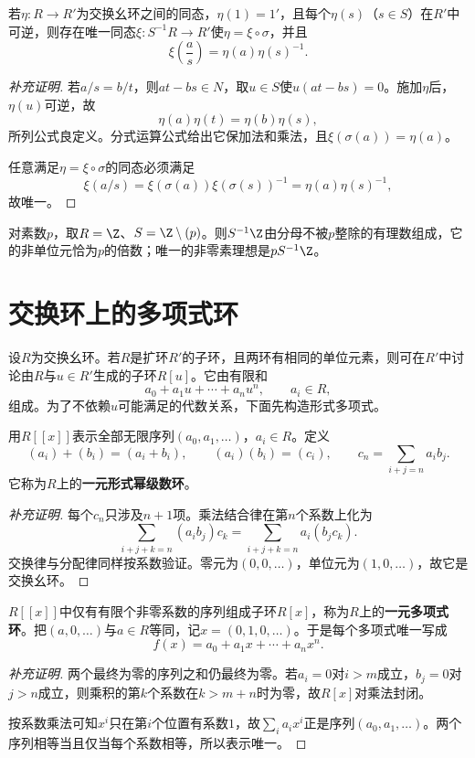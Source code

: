 \begin{theorem}\label{p2:localization-universal}
若$\eta:R\to R'$为交换幺环之间的同态，$\eta(1)=1'$，且每个$\eta(s)$（$s\in S$）在$R'$中可逆，则存在唯一同态$\xi:S^{-1}R\to R'$使$\eta=\xi\circ\sigma$，并且
\[
\xi\!\left(\frac as\right)=\eta(a)\eta(s)^{-1}.
\]
\end{theorem}
\begin{proof}[补充证明]
若$a/s=b/t$，则$at-bs\in N$，取$u\in S$使$u(at-bs)=0$。施加$\eta$后，$\eta(u)$可逆，故
\[
\eta(a)\eta(t)=\eta(b)\eta(s),
\]
所列公式良定义。分式运算公式给出它保加法和乘法，且$\xi(\sigma(a))=\eta(a)$。

任意满足$\eta=\xi\circ\sigma$的同态必须满足
\[
\xi(a/s)=\xi(\sigma(a))\xi(\sigma(s))^{-1}
=\eta(a)\eta(s)^{-1},
\]
故唯一。
\end{proof}

\begin{example}
对素数$p$，取$R=\Z$、$S=\Z\setminus(p)$。则$S^{-1}\Z$由分母不被$p$整除的有理数组成，它的非单位元恰为$p$的倍数；唯一的非零素理想是$pS^{-1}\Z$。
\end{example}

\section{交换环上的多项式环}

设$R$为交换幺环。若$R$是扩环$R'$的子环，且两环有相同的单位元素，则可在$R'$中讨论由$R$与$u\in R'$生成的子环$R[u]$。它由有限和
\[
a_0+a_1u+\cdots+a_nu^n,\qquad a_i\in R,
\]
组成。为了不依赖$u$可能满足的代数关系，下面先构造形式多项式。

\begin{definition}
用$R[[x]]$表示全部无限序列$(a_0,a_1,\ldots)$，$a_i\in R$。定义
\[
(a_i)+(b_i)=(a_i+b_i),\qquad
(a_i)(b_i)=(c_i),\qquad c_n=\sum_{i+j=n}a_ib_j.
\]
它称为$R$上的\textbf{一元形式幂级数环}。
\end{definition}
\begin{proof}[补充证明]
每个$c_n$只涉及$n+1$项。乘法结合律在第$n$个系数上化为
\[
\sum_{i+j+k=n}(a_ib_j)c_k
=\sum_{i+j+k=n}a_i(b_jc_k).
\]
交换律与分配律同样按系数验证。零元为$(0,0,\ldots)$，单位元为$(1,0,\ldots)$，故它是交换幺环。
\end{proof}

\begin{definition}
$R[[x]]$中仅有有限个非零系数的序列组成子环$R[x]$，称为$R$上的\textbf{一元多项式环}。把$(a,0,\ldots)$与$a\in R$等同，记$x=(0,1,0,\ldots)$。于是每个多项式唯一写成
\[
f(x)=a_0+a_1x+\cdots+a_nx^n.
\]
\end{definition}
\begin{proof}[补充证明]
两个最终为零的序列之和仍最终为零。若$a_i=0$对$i>m$成立，$b_j=0$对$j>n$成立，则乘积的第$k$个系数在$k>m+n$时为零，故$R[x]$对乘法封闭。

按系数乘法可知$x^i$只在第$i$个位置有系数$1$，故$\sum_i a_ix^i$正是序列$(a_0,a_1,\ldots)$。两个序列相等当且仅当每个系数相等，所以表示唯一。
\end{proof}

